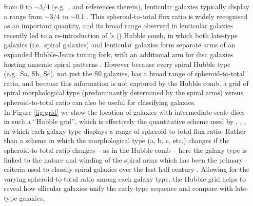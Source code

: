 \documentclass[useAMS,usenatbib,article]{mnras}
\begin{document}
from 0 to $\sim$3/4 (e.g.~\citealt{grahamworley2008}, and references
therein), lenticular galaxies typically display a range from
$\sim$3/4 to $\sim$0.1 \citep{laurikainen2010}.  This spheroid-to-total flux
ratio is widely recognised as an important quantity, and its broad range observed in
lenticular galaxies recently led to a re-introduction of 
\citeauthor{vandenbergh1976}'s (\citeyear{vandenbergh1976})
Hubble comb, in which both late-type galaxies (i.e.~spiral galaxies)
and lenticular galaxies form separate arms of an expanded Hubble-Jeans tuning
fork, with an additional arm for disc galaxies hosting anaemic spiral
patterns \citep{cappellari2011kmdr,kormendybender2012}.  
However because every spiral Hubble type (e.g.~Sa, Sb, Sc), not just the S0 galaxies, 
has a broad range of spheroid-to-total ratio, and because this information is not captured by the Hubble comb, 
a grid of spiral morphological type (predominantly determined by the spiral
arms) versus spheroid-to-total ratio can also be useful for classifying galaxies.  \\
In Figure \ref{fig:grid} we show the location of galaxies with intermediate-scale
discs in such a ``Hubble grid'', which is effectively the quantitative scheme used by  
\cite{boroson1981}, \cite{kent1985}, \cite{kodaira1986}, \cite{simiendevaucouleurs1986} 
in which each galaxy type displays a range of spheroid-to-total flux ratio.
Rather than a scheme in which the morphological type (a, b, c,
etc.) changes if the spheroid-to-total ratio changes -- as in the Hubble comb -- here
the galaxy type is linked to the nature and winding of the spiral arms
which has been the primary criteria used to classify spiral galaxies
over the last half century \citep{sandage1961}.  
Allowing for the varying spheroid-to-total ratio among each galaxy type, 
the Hubble grid helps to reveal how ellicular galaxies unify the early-type sequence and compare with late-type galaxies. 
\end{document}
